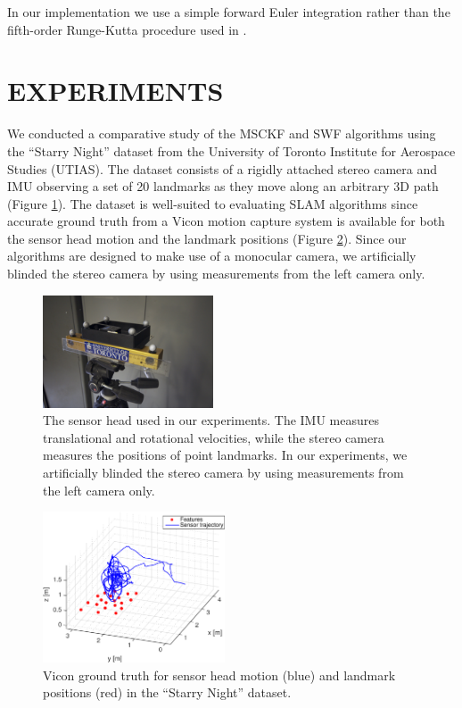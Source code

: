 \documentclass[letterpaper, 10 pt, conference]{ieeeconf}  %
\begin{document}
In our implementation we use a simple forward Euler integration rather than the fifth-order Runge-Kutta procedure used in \cite{Mourikis:2007:ICRA}.




\section{EXPERIMENTS} \label{sec:experiments}
We conducted a comparative study of the MSCKF and SWF algorithms using the ``Starry Night'' dataset from the University of Toronto Institute for Aerospace Studies (UTIAS).
The dataset consists of a rigidly attached stereo camera and IMU observing a set of 20 landmarks as they move along an arbitrary 3D path (Figure \ref{fig:sensorhead}).
The dataset is well-suited to evaluating SLAM algorithms since accurate ground truth from a Vicon motion capture system is available for both the sensor head motion and the landmark positions (Figure \ref{fig:trajectory_groundtruth}).
Since our algorithms are designed to make use of a monocular camera, we artificially blinded the stereo camera by using measurements from the left camera only.

\begin{figure}
    \centering
    \includegraphics[width=0.45\textwidth]{figs/sensorhead}
    \caption{The sensor head used in our experiments. The IMU measures translational and rotational velocities, while the stereo camera measures the positions of point landmarks. In our experiments, we artificially blinded the stereo camera by using measurements from the left camera only.}
    \label{fig:sensorhead}
\end{figure}

\begin{figure}
    \centering
    \includegraphics[width=0.48\textwidth]{figs/trajectory_groundtruth}
    \caption{Vicon ground truth for sensor head motion (blue) and landmark positions (red) in the ``Starry Night'' dataset.}
    \label{fig:trajectory_groundtruth}
\end{figure}
\end{document}
